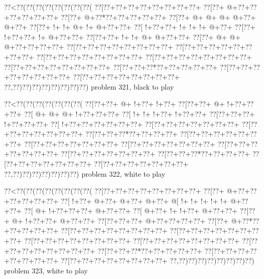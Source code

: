 \vbox{\vbox{\goo
\0??<\0??(\0??(\0??(\0??(\0??(\0??(\0??(\0??(
\0??[\0??+\0??+\0??+\0??+\0??+\0??+\0??+\0??+
\0??[\0??+\- @+\0??+\0??+\0??+\0??+\0??+\0??+
\0??[\0??+\- @+\0??*\0??+\0??+\0??+\0??+\0??+
\0??[\0??+\- @+\- @+\- @+\- @+\0??+\- @+\0??+
\0??[\0??+\- !+\- !+\- @+\- !+\- @+\0??+\0??+
\0??[\- !+\0??+\0??+\- !+\- !+\- !+\- @+\0??+
\0??[\0??+\- !+\0??+\0??+\- !+\- @+\0??+\0??+
\0??[\0??+\0??+\- !+\- !+\- @+\- @+\0??+\0??+
\0??[\0??+\- @+\- @+\- @+\0??+\0??+\0??+\0??+
\0??[\0??+\0??+\0??+\0??+\0??+\0??+\0??+\0??+
\0??[\0??+\0??+\0??+\0??+\0??+\0??+\0??+\0??+
\0??[\0??+\0??+\0??+\0??+\0??+\0??+\0??+\0??+
\0??[\0??+\0??+\0??+\0??+\0??+\0??+\0??+\0??+
\0??[\0??+\0??+\0??+\0??+\0??+\0??+\0??+\0??+
\0??[\0??+\0??+\0??*\0??+\0??+\0??+\0??+\0??+
\0??[\0??+\0??+\0??+\0??+\0??+\0??+\0??+\0??+
\0??[\0??+\0??+\0??+\0??+\0??+\0??+\0??+\0??+
\0??,\0??)\0??)\0??)\0??)\0??)\0??)\0??)\0??)
}
\hfil problem 321, black to play\hfil\break
}

\vbox{\vbox{\goo
\0??<\0??(\0??(\0??(\0??(\0??(\0??(\0??(
\0??[\0??+\0??+\- @+\- !+\0??+\- !+\0??+
\0??[\0??+\0??+\- @+\- !+\0??+\0??+\0??+
\0??[\- @+\- @+\- @+\- !+\0??+\0??+\0??+
\0??[\- !+\- !+\- !+\0??+\- !+\0??+\0??+
\0??[\0??+\0??+\0??+\- !+\0??+\0??+\0??+
\0??[\- !+\0??+\0??+\0??+\0??+\0??+\0??+
\0??[\0??+\0??+\0??+\0??+\0??+\0??+\0??+
\0??[\0??+\0??+\0??+\0??+\0??+\0??+\0??+
\0??[\0??+\0??+\0??*\0??+\0??+\0??+\0??+
\0??[\0??+\0??+\0??+\0??+\0??+\0??+\0??+
\0??[\0??+\0??+\0??+\0??+\0??+\0??+\0??+
\0??[\0??+\0??+\0??+\0??+\0??+\0??+\0??+
\0??[\0??+\0??+\0??+\0??+\0??+\0??+\0??+
\0??[\0??+\0??+\0??+\0??+\0??+\0??+\0??+
\0??[\0??+\0??+\0??*\0??+\0??+\0??+\0??+
\0??[\0??+\0??+\0??+\0??+\0??+\0??+\0??+
\0??[\0??+\0??+\0??+\0??+\0??+\0??+\0??+
\0??,\0??)\0??)\0??)\0??)\0??)\0??)\0??)
}
\hfil problem 322, white to play\hfil\break
}

\vbox{\vbox{\goo
\0??<\0??(\0??(\0??(\0??(\0??(\0??(\0??(\0??(
\0??[\0??+\0??+\0??+\0??+\0??+\0??+\0??+\0??+
\0??[\0??+\- @+\0??+\0??+\0??+\0??+\0??+\0??+
\0??[\- !+\0??+\- @+\0??+\- @+\0??+\- @+\0??+
\- @[\- !+\- !+\- !+\- !+\- !+\- @+\0??+\0??+
\0??[\- @+\- !+\0??+\0??+\0??+\- @+\0??+\0??+
\0??[\- @+\0??+\- !+\- !+\0??+\- @+\0??+\0??+
\0??[\0??+\- @+\- !+\0??+\0??+\- @+\0??+\0??+
\0??[\0??+\0??+\0??+\- @+\0??+\0??+\0??+\0??+
\0??[\0??+\- @+\0??*\0??+\0??+\0??+\0??+\0??+
\0??[\0??+\0??+\0??+\0??+\0??+\0??+\0??+\0??+
\0??[\0??+\0??+\0??+\0??+\0??+\0??+\0??+\0??+
\0??[\0??+\0??+\0??+\0??+\0??+\0??+\0??+\0??+
\0??[\0??+\0??+\0??+\0??+\0??+\0??+\0??+\0??+
\0??[\0??+\0??+\0??+\0??+\0??+\0??+\0??+\0??+
\0??[\0??+\0??+\0??*\0??+\0??+\0??+\0??+\0??+
\0??[\0??+\0??+\0??+\0??+\0??+\0??+\0??+\0??+
\0??[\0??+\0??+\0??+\0??+\0??+\0??+\0??+\0??+
\0??,\0??)\0??)\0??)\0??)\0??)\0??)\0??)\0??)
}
\hfil problem 323, white to play\hfil\break
}

